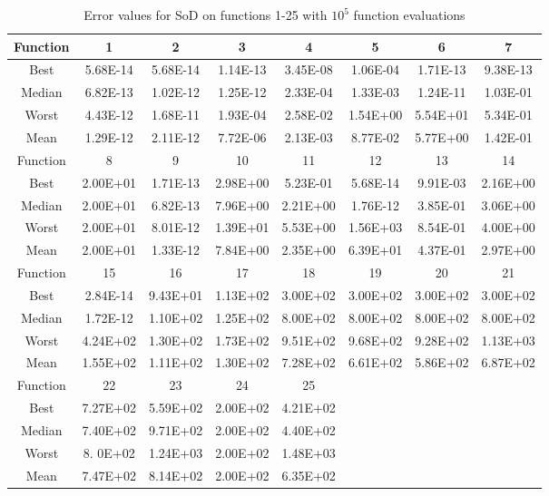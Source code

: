 \begin{table}[h]
\footnotesize
  \centering
\begin{tabular}{@{}cccccccc@{}}
\toprule
Function&1       &2       &3       &4       &5       &6       &7     \\ \midrule
Best    &5.68E-14&5.68E-14&1.14E-13&3.45E-08&1.06E-04&1.71E-13&9.38E-13 \\
Median  &6.82E-13&1.02E-12&1.25E-12&2.33E-04&1.33E-03&1.24E-11&1.03E-01\\
Worst   &4.43E-12&1.68E-11&1.93E-04&2.58E-02&1.54E+00&5.54E+01&5.34E-01\\
Mean    &1.29E-12&2.11E-12&7.72E-06&2.13E-03&8.77E-02&5.77E+00&1.42E-01\\\midrule
Function&8       &9       &10      &11      &12      &13      &14      \\\midrule
Best    &2.00E+01&1.71E-13&2.98E+00&5.23E-01&5.68E-14&9.91E-03&2.16E+00\\
Median  &2.00E+01&6.82E-13&7.96E+00&2.21E+00&1.76E-12&3.85E-01&3.06E+00 \\
Worst   &2.00E+01&8.01E-12&1.39E+01&5.53E+00&1.56E+03&8.54E-01&4.00E+00\\
Mean    &2.00E+01&1.33E-12&7.84E+00&2.35E+00&6.39E+01&4.37E-01&2.97E+00\\\midrule
Function&15      &16      &17      &18      &19      &20      &21\\\midrule
Best    &2.84E-14&9.43E+01&1.13E+02&3.00E+02&3.00E+02&3.00E+02&3.00E+02\\
Median  &1.72E-12&1.10E+02&1.25E+02&8.00E+02&8.00E+02&8.00E+02&8.00E+02\\
Worst   &4.24E+02&1.30E+02&1.73E+02&9.51E+02&9.68E+02&9.28E+02&1.13E+03\\
Mean    &1.55E+02&1.11E+02&1.30E+02&7.28E+02&6.61E+02&5.86E+02&6.87E+02\\\midrule
Function&22      &23      &24      &25&&&\\\midrule
Best    &7.27E+02&5.59E+02&2.00E+02&4.21E+02&&&\\
Median  &7.40E+02&9.71E+02&2.00E+02&4.40E+02&&&\\
Worst   &8. 0E+02&1.24E+03&2.00E+02&1.48E+03&&&\\
Mean    &7.47E+02&8.14E+02&2.00E+02&6.35E+02&&&\\\bottomrule
\end{tabular}
\caption{Error values for SoD on functions 1-25 with $10^5$ function evaluations}
\label{table:errorSoD}
\end{table}

